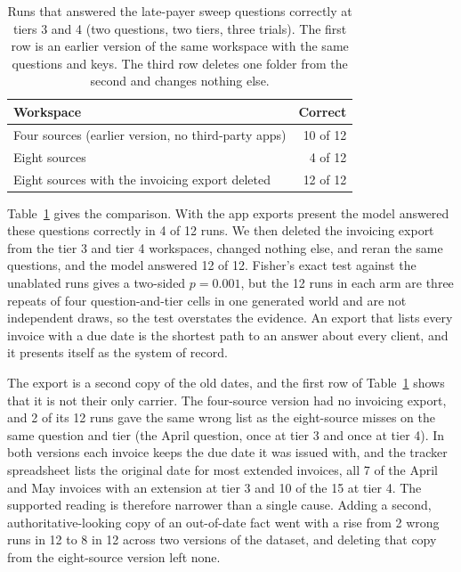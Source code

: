 \documentclass{article}
\begin{document}
\begin{table}[t]
  \caption{Runs that answered the late-payer sweep questions correctly at tiers 3 and 4 (two questions, two tiers, three trials). The first row is an earlier version of the same workspace with the same questions and keys. The third row deletes one folder from the second and changes nothing else.}
  \label{tab:lag}
  \centering
  \small
  \begin{tabular}{@{}lr@{}}
    \toprule
    Workspace & Correct \\
    \midrule
    Four sources (earlier version, no third-party apps) & 10 of 12 \\
    Eight sources                                       & 4 of 12 \\
    Eight sources with the invoicing export deleted     & 12 of 12 \\
    \bottomrule
  \end{tabular}
\end{table}

Table~\ref{tab:lag} gives the comparison. With the app exports present the model answered these questions correctly in 4 of 12 runs. We then deleted the invoicing export from the tier 3 and tier 4 workspaces, changed nothing else, and reran the same questions, and the model answered 12 of 12. Fisher's exact test against the unablated runs gives a two-sided $p = 0.001$, but the 12 runs in each arm are three repeats of four question-and-tier cells in one generated world and are not independent draws, so the test overstates the evidence. An export that lists every invoice with a due date is the shortest path to an answer about every client, and it presents itself as the system of record.

The export is a second copy of the old dates, and the first row of Table~\ref{tab:lag} shows that it is not their only carrier. The four-source version had no invoicing export, and 2 of its 12 runs gave the same wrong list as the eight-source misses on the same question and tier (the April question, once at tier 3 and once at tier 4). In both versions each invoice keeps the due date it was issued with, and the tracker spreadsheet lists the original date for most extended invoices, all 7 of the April and May invoices with an extension at tier 3 and 10 of the 15 at tier 4. The supported reading is therefore narrower than a single cause. Adding a second, authoritative-looking copy of an out-of-date fact went with a rise from 2 wrong runs in 12 to 8 in 12 across two versions of the dataset, and deleting that copy from the eight-source version left none.
\end{document}
